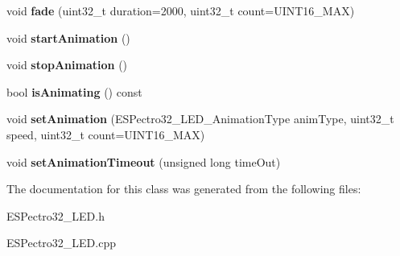 \begin{DoxyCompactItemize}
\item 
\hypertarget{classESPectro32__LED_ae62a8f030848ec21aa3097120b2e9de0}{void {\bfseries fade} (uint32\-\_\-t duration=2000, uint32\-\_\-t count=U\-I\-N\-T16\-\_\-\-M\-A\-X)}\label{classESPectro32__LED_ae62a8f030848ec21aa3097120b2e9de0}

\item 
\hypertarget{classESPectro32__LED_a3398072d6b5e0969e7081db69baf2101}{void {\bfseries start\-Animation} ()}\label{classESPectro32__LED_a3398072d6b5e0969e7081db69baf2101}

\item 
\hypertarget{classESPectro32__LED_a30f73cf9358f05a725642f1e5e3bd884}{void {\bfseries stop\-Animation} ()}\label{classESPectro32__LED_a30f73cf9358f05a725642f1e5e3bd884}

\item 
\hypertarget{classESPectro32__LED_a93f2eebe2b745f8b5e4ad05d5833e80f}{bool {\bfseries is\-Animating} () const }\label{classESPectro32__LED_a93f2eebe2b745f8b5e4ad05d5833e80f}

\item 
\hypertarget{classESPectro32__LED_a7dc5619a2a6a47dafcd8ead44f0eba87}{void {\bfseries set\-Animation} (E\-S\-Pectro32\-\_\-\-L\-E\-D\-\_\-\-Animation\-Type anim\-Type, uint32\-\_\-t speed, uint32\-\_\-t count=U\-I\-N\-T16\-\_\-\-M\-A\-X)}\label{classESPectro32__LED_a7dc5619a2a6a47dafcd8ead44f0eba87}

\item 
\hypertarget{classESPectro32__LED_aaaedc9ff43ce728968e924aad46da54a}{void {\bfseries set\-Animation\-Timeout} (unsigned long time\-Out)}\label{classESPectro32__LED_aaaedc9ff43ce728968e924aad46da54a}

\end{DoxyCompactItemize}


The documentation for this class was generated from the following files\-:\begin{DoxyCompactItemize}
\item 
E\-S\-Pectro32\-\_\-\-L\-E\-D.\-h\item 
E\-S\-Pectro32\-\_\-\-L\-E\-D.\-cpp\end{DoxyCompactItemize}
